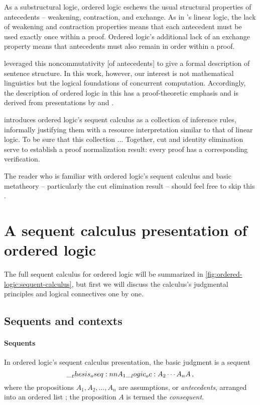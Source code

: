 As a substructural logic, ordered logic eschews the usual structural properties of antecedents -- weakening, contraction, and exchange.
As in \citeauthor{Girard:TCS87}'s linear logic\autocite{Girard:TCS87}, the lack of weakening and contraction properties means that each antecedent must be used exactly once within a proof.
Ordered logic's additional lack of an exchange property means that antecedents must also remain in order within a proof.

 leveraged this noncommutativity [of antecedents] to give a formal description of sentence structure.
In this work, however, our interest is not mathematical linguistics but the logical foundations of concurrent computation.
Accordingly, the description of ordered logic in this  has a proof-theoretic emphasis and is derived from presentations by \textcite{Pfenning:CMU16} and \textcite{Polakow+Pfenning:MFPS99}.

 introduces ordered logic's sequent calculus as a collection of inference rules, informally justifying them with a resource interpretation similar to that of linear logic\autocite{??}.
To be sure that this collection ...
Together, cut and identity elimination ~ serve to establish a proof normalization result: every proof has a corresponding verification.


The reader who is familiar with ordered logic's sequent calculus and basic metatheory -- particularly the cut elimination result -- should feel free to skip this .


\section{A sequent calculus presentation of ordered logic}\label{sec:ordered-logic:sequent-calculus}

The full sequent calculus for ordered logic will be summarized in \cref{fig:ordered-logic:sequent-calculus}, but first we will discuss the calculus's judgmental principles and logical connectives one by one.

\subsection{Sequents and contexts}

\paragraph{Sequents}
In ordered logic's sequent calculus presentation, the basic judgment is a sequent
\begin{equation*}
  \oseq{A_1 \oc A_2 \dotsb A_n |- A} \,,
\end{equation*}
where the propositions $A_1, A_2, \dotsc, A_n$ are assumptions, or \emph{antecedents}, arranged into an ordered list%
; the proposition $A$ is termed the \emph{consequent}.

